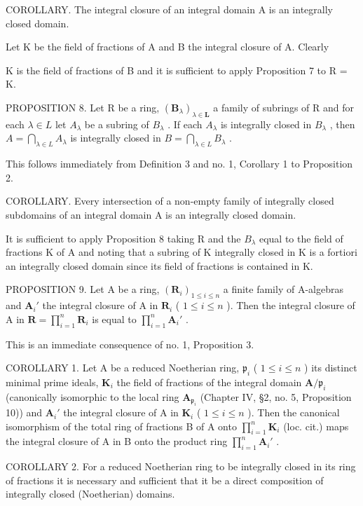 COROLLARY. The integral closure of an integral domain A is an integrally closed domain.

Let K be the field of fractions of A and B the integral closure of A. Clearly

K is the field of fractions of B and it is sufficient to apply Proposition 7 to R = K.

PROPOSITION 8. Let R be a ring, \((\mathbf{B}_{\lambda})_{\lambda \in \mathbf{L}}\) a family of subrings of R and for each \(\lambda \in L\) let \(A_{\lambda}\) be a subring of \(B_{\lambda}\) . If each \(A_{\lambda}\) is integrally closed in \(B_{\lambda}\) , then \(A = \bigcap_{\lambda \in L} A_{\lambda}\) is integrally closed in \(B = \bigcap_{\lambda \in L} B_{\lambda}\) .

This follows immediately from Definition 3 and no. 1, Corollary 1 to Proposition 2.

COROLLARY. Every intersection of a non-empty family of integrally closed subdomains of an integral domain A is an integrally closed domain.

It is sufficient to apply Proposition 8 taking R and the \(B_{\lambda}\) equal to the field of fractions K of A and noting that a subring of K integrally closed in K is a fortiori an integrally closed domain since its field of fractions is contained in K.

PROPOSITION 9. Let A be a ring, \((\mathbf{R}_i)_{1 \leqslant i \leqslant n}\) a finite family of A-algebras and \(\mathbf{A}_i'\) the integral closure of A in \(\mathbf{R}_i\) ( \(1 \leqslant i \leqslant n\) ). Then the integral closure of A in \(\mathbf{R} = \prod_{i=1}^{n} \mathbf{R}_i\) is equal to \(\prod_{i=1}^{n} \mathbf{A}_i'\) .

This is an immediate consequence of no. 1, Proposition 3.

COROLLARY 1. Let A be a reduced Noetherian ring, \(\mathfrak{p}_i\) ( \(1 \leqslant i \leqslant n\) ) its distinct minimal prime ideals, \(\mathbf{K}_i\) the field of fractions of the integral domain \(\mathbf{A} / \mathfrak{p}_i\) (canonically isomorphic to the local ring \(\mathbf{A}_{\mathfrak{p}_i}\) (Chapter IV, §2, no. 5, Proposition 10)) and \(\mathbf{A}_i'\) the integral closure of A in \(\mathbf{K}_i\) ( \(1 \leqslant i \leqslant n\) ). Then the canonical isomorphism of the total ring of fractions B of A onto \(\prod_{i=1}^{n} \mathbf{K}_i\) (loc. cit.) maps the integral closure of A in B onto the product ring \(\prod_{i=1}^{n} \mathbf{A}_i'\) .

COROLLARY 2. For a reduced Noetherian ring to be integrally closed in its ring of fractions it is necessary and sufficient that it be a direct composition of integrally closed (Noetherian) domains.

